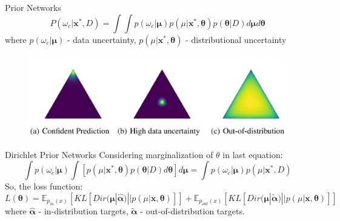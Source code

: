\documentclass{beamer}
\begin{document}
\begin{frame}{Prior Networks}
    $$P(\omega_c | \mathbf{x}^*, D) = \int \int p(\omega_c | \mathbf{\mu}) p(\mu | \mathbf{x}^*, \mathbf{\theta})p(\mathbf{\theta}|D) d\mathbf{\mu}d\mathbf{\theta}$$
    where $p(\omega_c | \mathbf{\mu})$ - data uncertainty,
    $p(\mu | \mathbf{x}^*, \mathbf{\theta})$ - distributional uncertainty
    \begin{figure}[h]
        \includegraphics[scale=0.25]{examples.jpg}
     \end{figure}
\end{frame}
\begin{frame}{Dirichlet Prior Networks}
    Considering marginalization of $\theta$ in last equation:
    $$\int p(\omega_c | \mathbf{\mu}) \int \left[ p(\mu | \mathbf{x}^*, \mathbf{\theta})p(\mathbf{\theta}|D) d\mathbf{\theta} \right] d\mathbf{\mu} = \int p(\omega_c | \mathbf{\mu}) p(\mu | \mathbf{x}^*, D)$$
    So, the loss function:
    $$L(\mathbf{\theta}) = \mathbb{E}_{p_{in}(x)}[KL[Dir(\mathbf{\mu} | \mathbf{\hat{\alpha}}) || p(\mu | \mathbf{x}, \mathbf{\theta})]] + \mathbb{E}_{p_{out}(x)}[KL[Dir(\mathbf{\mu} | \mathbf{\tilde{\alpha}}) || p(\mu | \mathbf{x}, \mathbf{\theta})]]$$
    where $\mathbf{\hat{\alpha}}$ - in-distribution targets,
    $\mathbf{\tilde{\alpha}}$ - out-of-distribution targets.
\end{frame}
\end{document}

